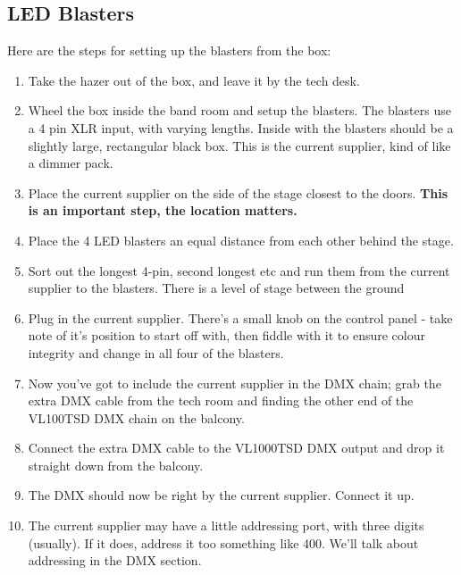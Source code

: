\documentclass[11pt,a4paper]{book}
\begin{document}
\subsection{LED Blasters}
Here are the steps for setting up the blasters from the box:
\begin{enumerate}
\item Take the hazer out of the box, and leave it by the tech desk.
\item Wheel the box inside the band room and setup the blasters. The blasters use a 4 pin XLR input, with varying lengths. Inside with the blasters should be a slightly large, rectangular black box. This is the current supplier, kind of like a dimmer pack.
\item Place the current supplier on the side of the stage closest to the doors. \textbf{This is an important step, the location matters.}
\item Place the 4 LED blasters an equal distance from each other behind the stage. 
\item Sort out the longest 4-pin, second longest etc and run them from the current supplier to the blasters. There is a level of stage between the ground
\item Plug in the current supplier. There's a small knob on the control panel - take note of it's position to start off with, then fiddle with it to ensure colour integrity and change in all four of the blasters. 
\item Now you've got to include the current supplier in the DMX chain; grab the extra DMX cable from the tech room and finding the other end of the VL100TSD DMX chain on the balcony.
\item Connect the extra DMX cable to the VL1000TSD DMX output and drop it straight down from the balcony.
\item The DMX should now be right by the current supplier. Connect it up.
\item The current supplier may have a little addressing port, with three digits (usually). If it does, address it too something like 400. We'll talk about addressing in the DMX section.
\end{enumerate}
\end{document}
